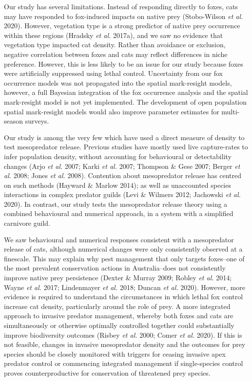 \documentclass[]{elsarticle} %
\begin{document}
Our study has several limitations. Instead of responding directly to foxes, cats may have responded to fox-induced impacts on native prey (Stobo-Wilson \emph{et al.} 2020). However, vegetation type is a strong predictor of native prey occurrence within these regions (Hradsky \emph{et al.} 2017a), and we saw no evidence that vegetation type impacted cat density. Rather than avoidance or exclusion, negative correlation between foxes and cats may reflect differences in niche preference. However, this is less likely to be an issue for our study because foxes were artificially suppressed using lethal control. Uncertainty from our fox occurrence models was not propagated into the spatial mark-resight models, however, a full Bayesian integration of the fox occurrence analysis and the spatial mark-resight model is not yet implemented. The development of open population spatial mark-resight models would also improve parameter estimates for multi-season surveys.

Our study is among the very few which have used a direct measure of density to test mesopredator release. Previous studies have mostly used live capture-rates to infer population density, without accounting for behavioural or detectability changes (Arjo \emph{et al.} 2007; Karki \emph{et al.} 2007; Thompson \& Gese 2007; Berger \emph{et al.} 2008; Jones \emph{et al.} 2008). Contention about mesopredator release has centred on such methods (Hayward \& Marlow 2014); as well as unaccounted species interactions in complex predator guilds (Levi \& Wilmers 2012; Jachowski \emph{et al.} 2020). In contrast, our study tests the mesopredator release theory using a combined behavioural and numerical approach, in a system with a simplified carnivore guild.

We saw behavioural and numerical responses consistent with a mesopredator release of cats, although numerical changes were only consistently observed at a finescale. This may explain why pest management that only targets foxes--one of the most prevalent conservation actions in Australia--does not consistently improve native prey persistence (Dexter \& Murray 2009; Robley \emph{et al.} 2014; Wayne \emph{et al.} 2017; Lindenmayer \emph{et al.} 2018; Duncan \emph{et al.} 2020). However, more evidence is required to understand the circumstances in which lethal fox control increase cat density, particularly around the role of prey. A more integrated approach to invasive predator management, whereby both foxes and cats are simultaneously or otherwise optimally controlled together could substantially improve biodiversity outcomes (Risbey \emph{et al.} 2000; Comer \emph{et al.} 2020). If this is not feasible, changes in invasive mesopredator density and the outcomes for prey species should be closely monitored with triggers for ceasing invasive apex predator control or commencing integrated management if single-species control proves counterproductive for conservation of threatened prey species.
\end{document}
